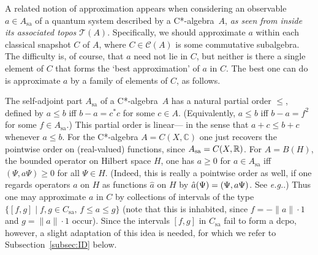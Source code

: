 \documentclass[11pt]{article}
\newcommand{\ca}{C*-algebra} \newcommand{\jba}{JB-algebra}
\newcommand{\C}{{\mathbb C}} \newcommand{\D}{{\mathbb D}}
\newcommand{\asstopos}{\ensuremath{\mathcal{T}}}
\newcommand{\sa}{\ensuremath{_{\mathrm{sa}}}}
\newcommand{\eg}{\textit{e.g.}}
\begin{document}
A related notion of approximation  appears
when considering an observable $a \in A\sa$ of a quantum system described by a
\ca\ $A$,
{\it as seen from inside its associated topos
$\asstopos(A)$}. Specifically, we should approximate $a$ within
 each  classical snapshot $C$ of $A$, where $C\in \mathcal{C}(A)$ is some
 commutative subalgebra. The difficulty is, of course, that
$a$ need not lie in $C$, but neither is there a single element of $C$ that forms
the `best approximation' of $a$ in $C$. The best one can do is
approximate $a$ by a family of elements of $C$, as follows. 

The self-adjoint part $A\sa$ of a \ca\ $A$ has a natural
 partial order $\leqslant$, defined
 by $a\leqslant b$ iff $b-a=c^*c$ for some $c\in A$. (Equivalently, $a\leqslant
 b$ iff $b-a=f^2$ for some $f\in A\sa$.) This partial order is linear---
 in the sense that $a+c\leqslant b+c$ whenever $a \leqslant b$.  For the
 C*-algebra $A=C(X,\C)$ one just recovers the pointwise order on
 (real-valued) functions, since $A\sa=C(X,\R)$.
 For $A=B(H)$, the
 bounded operator on Hilbert space $H$, one has $a\geq 0$ for $a\in
 A\sa$ iff $(\Psi,a\Psi)\geq 0$ for all $\Psi\in H$. (Indeed, this is
 really a pointwise order as well, if one regards operators $a$ on $H$
 as functions $\hat{a}$ on  $H$
 by $\hat{a}(\Psi)=(\Psi,a\Psi)$. See \eg\cite{landsman98}.) Thus one may
approximate $a$ in $C$ by collections of intervals of the type
 $\{[f,g]\mid f,g \in C\sa,\, f\leqslant a\leqslant g\}$ (note that this is
 inhabited, since $f=-\|a\|\cdot 1$ and $g=\|a\|\cdot 1$ occur). Since
 the intervals $[f,g]$ in $C\sa$ fail to form a dcpo, however, a
 slight adaptation of this idea is needed, for which we refer to
 Subsection~\ref{subsec:ID} below.
\end{document}
